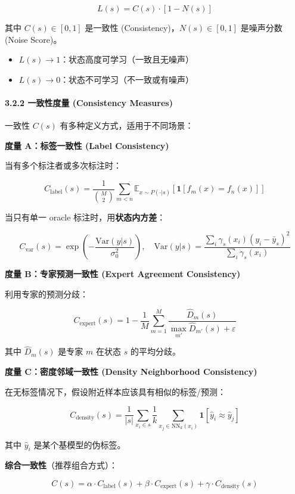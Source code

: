 \documentclass[
  12pt,
]{ctexart}
\providecommand{\tightlist}{%
  \setlength{\itemsep}{0pt}\setlength{\parskip}{0pt}}
\begin{document}
\[
L(s) = C(s) \cdot [1 - N(s)]
\]

其中 \(C(s) \in [0,1]\) 是一致性 (Consistency)，\(N(s) \in [0,1]\)
是噪声分数 (Noise Score)。

\begin{itemize}
\tightlist
\item
  \(L(s) \to 1\)：状态高度可学习（一致且无噪声）
\item
  \(L(s) \to 0\)：状态不可学习（不一致或有噪声）
\end{itemize}

\paragraph{3.2.2 一致性度量 (Consistency
Measures)}\label{ux4e00ux81f4ux6027ux5ea6ux91cf-consistency-measures}

一致性 \(C(s)\) 有多种定义方式，适用于不同场景：

\textbf{度量 A：标签一致性 (Label Consistency)}

当有多个标注者或多次标注时：

\[
C_{\text{label}}(s) = \frac{1}{\binom{M}{2}} \sum_{m < n} \mathbb{E}_{x \sim P(\cdot|s)}[\mathbf{1}[f_m(x) = f_n(x)]]
\]

当只有单一 oracle 标注时，用\textbf{状态内方差}：

\[
C_{\text{var}}(s) = \exp\left(-\frac{\text{Var}(y|s)}{\sigma_0^2}\right), \quad \text{Var}(y|s) = \frac{\sum_i \gamma_s(x_i)(y_i - \bar{y}_s)^2}{\sum_i \gamma_s(x_i)}
\]

\textbf{度量 B：专家预测一致性 (Expert Agreement Consistency)}

利用专家的预测分歧：

\[
C_{\text{expert}}(s) = 1 - \frac{1}{M} \sum_{m=1}^M \frac{\hat{D}_m(s)}{\max_{m'} \hat{D}_{m'}(s) + \varepsilon}
\]

其中 \(\hat{D}_m(s)\) 是专家 \(m\) 在状态 \(s\) 的平均分歧。

\textbf{度量 C：密度邻域一致性 (Density Neighborhood Consistency)}

在无标签情况下，假设附近样本应该具有相似的标签/预测：

\[
C_{\text{density}}(s) = \frac{1}{|s|} \sum_{x_i \in s} \frac{1}{k} \sum_{x_j \in \text{NN}_k(x_i)} \mathbf{1}[\hat{y}_i \approx \hat{y}_j]
\]

其中 \(\hat{y}_i\) 是某个基模型的伪标签。

\textbf{综合一致性}（推荐组合方式）：

\[
C(s) = \alpha \cdot C_{\text{label}}(s) + \beta \cdot C_{\text{expert}}(s) + \gamma \cdot C_{\text{density}}(s)
\]
\end{document}
